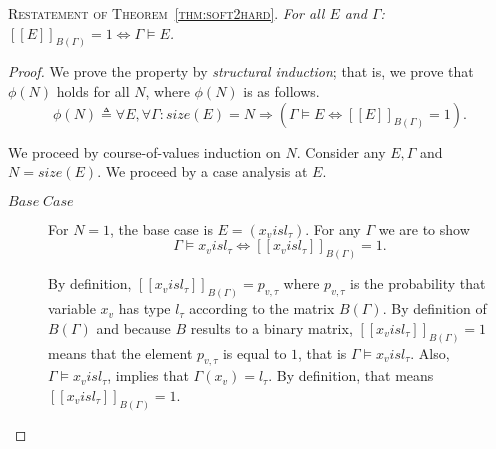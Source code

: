 \documentclass[acmsmall,nonacm]{acmart}\settopmatter{printfolios=true,printccs=false,printacmref=false}
\newcommand{\qqpi}[2]{[\![#2]\!]_{#1}}
\newcommand{\restate}[1]{\textsc{Restatement of #1}. \hspace*{1pt} \it}
\begin{document}
\restate{Theorem~\ref{thm:soft2hard}} For all $E$ and $\Gamma$: $\qqpi{B(\Gamma)}{E} = 1 \Leftrightarrow \Gamma \models E$.
\begin{proof}
  We prove the property by \emph{structural induction}; that is,
  we prove that $\phi(N)$ holds for all $N$, where $\phi(N)$ is as follows.
        \begin{equation*}
            \phi(N) \triangleq
                \forall E, \forall \Gamma :
                size(E)=N \Rightarrow (\Gamma \models E \Leftrightarrow \qqpi{B(\Gamma)}{E} = 1).
        \end{equation*}
        
  We proceed by course-of-values induction on $N$.
  Consider any $E, \Gamma$ and $N = size(E)$. We proceed by a case analysis at $E$.
  \begin{description}
      \item[$Base\;Case$]
                  For $N=1$, the base case is $E = (x_v \mathrel{is} l_\tau)$.
                  For any $\Gamma$ we are to show
                  \begin{equation*}
                  \Gamma \models x_v \mathrel{is} l_\tau \Leftrightarrow{}\qqpi{B(\Gamma)}{x_v \mathrel{is} l_\tau} = 1.
                  \end{equation*}
                  
                  By definition, $\qqpi{B(\Gamma)}{x_v \mathrel{is} l_\tau} = p_{v,\tau}$
                  where $p_{v,\tau}$ is the probability that variable $x_v$ has type $l_\tau$ according to the matrix $B(\Gamma)$. 
                  By definition of $B(\Gamma)$ and because $B$ results to  a binary matrix,  
                  $\qqpi{B(\Gamma)}{x_v \mathrel{is} l_\tau} = 1$
                  means that the element $p_{v,\tau}$ is equal to $1$, that is 
                  $\Gamma \models x_v \mathrel{is} l_\tau$.
                  Also, $\Gamma \models x_v \mathrel{is} l_\tau$, implies that $\Gamma(x_v)=l_\tau$. By definition, that
                  means  $\qqpi{B(\Gamma)}{x_v \mathrel{is} l_\tau} = 1$.
      

\end{description}
\end{proof}
\end{document}
